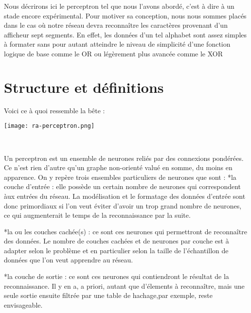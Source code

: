\documentclass[a4paper,10pt]{report}
\begin{document}
Nous d\'ecrirons ici le perceptron tel que nous l'avons abord\'e, c'est \`a
dire \`a un stade encore exp\'erimental. Pour motiver sa conception,
nous nous sommes plac\'es dans le cas o\`u notre r\'eseau devra
reconna\^itre les caract\`eres provenant d'un afficheur sept
segments. En effet, les donn\'ees d'un tel alphabet sont assez simples
\`a formater sans pour autant atteindre le niveau de simplicit\'e d'une
fonction logique de base comme le OR ou l\'eg\`erement plus avanc\'ee
comme le XOR

\pagebreak
\section{Structure et d\'efinitions} %
\label{subsec:structure_et_definitions}

Voici ce \`a quoi ressemble la b\^ete :
\begin{center}
	
	\texttt{[image: ra-perceptron.png]}\\
	\caption{\emph{Perceptron \`a une couche cach\'ee}}\\
\end{center}

Un perceptron est un ensemble de neurones reli\'es par des connexions
pond\'er\'ees. Ce n'est rien d'autre qu'un graphe non-orient\'e valu\'e
en somme, du moins en apparence. On y rep\`ere trois ensembles
particuliers de neurones que sont : 
*la couche d'entr\'ee : elle poss\`ede un certain nombre de neurones qui
correspondent \`aux entr\'ees du r\'eseau. La mod\'elisation et le
formatage des donn\'ees d'entr\'ee sont donc primordiaux si l'on veut
\'eviter d'avoir un trop grand nombre de neurones, ce qui augmenterait
le temps de la reconnaissance par la suite.

*la ou les couches cach\'ee(s) : ce sont ces neurones qui permettront de
reconna\^itre des donn\'ees. Le nombre de couches cach\'ees et de
neurones par couche est \`a adapter selon le probl\`eme et en
particulier selon la taille de l'\'echantillon de donn\'ees que l'on veut
apprendre au r\'eseau.

*la couche de sortie : ce sont ces neurones qui contiendront le
r\'esultat de la reconnaissance. Il y en a, a priori, autant que
d'\'elements \`a reconna\^itre, mais une seule sortie ensuite filtr\'ee
par une table de hachage,par exemple, reste envisageable.
\end{document}
